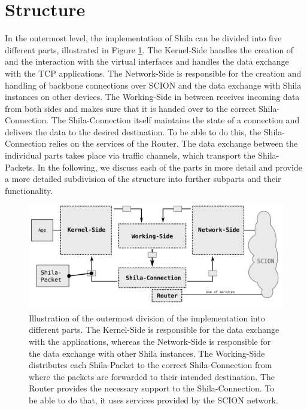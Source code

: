 \newpage
\section{Structure}
\label{sec:ImplementationStructure}

In the outermost level, the implementation of Shila can be divided into five different parts, illustrated in Figure \ref{fig:ImplementationModulesOutermost}. The Kernel-Side handles the creation of and the interaction with the virtual interfaces and handles the data exchange with the TCP applications. The Network-Side is responsible for the creation and handling of backbone connections over SCION and the data exchange with Shila instances on other devices. The Working-Side in between receives incoming data from both sides and makes sure that it is handed over to the correct Shila-Connection. The Shila-Connection itself maintains the state of a connection and delivers the data to the desired destination. To be able to do this, the Shila-Connection relies on the services of the Router.  The data exchange between the individual parts takes place via traffic channels, which transport the Shila-Packets. In the following, we discuss each of the parts in more detail and provide a more detailed subdivision of the structure into further subparts and their functionality.  

\begin{figure}[H]
	\begin{center}
		\def\svgwidth{1\textwidth}
		\includegraphics[scale=0.2]{../illustrations/implementation/ModulesOutermost.pdf}   
		\caption[]{Illustration of the outermost division of the implementation into different parts. The Kernel-Side is responsible for the data exchange with the applications, whereas the Network-Side is responsible for the data exchange with other Shila instances. The Working-Side distributes each Shila-Packet to the correct Shila-Connection from where the packets are forwarded to their intended destination. The Router provides the necessary support to the Shila-Connection. To be able to do that, it uses services provided by the SCION network.}
		\label{fig:ImplementationModulesOutermost}
	\end{center}
\end{figure}

